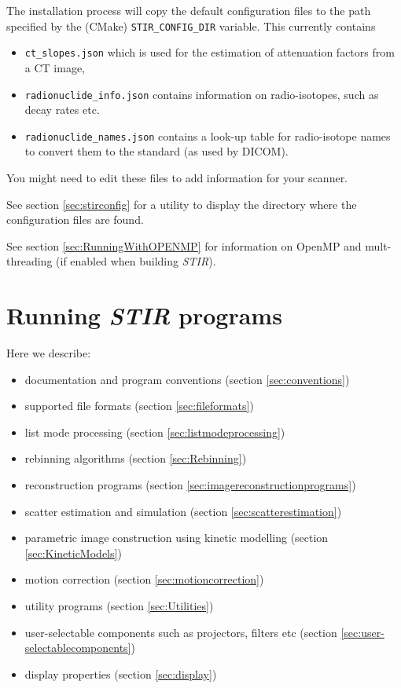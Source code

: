 \documentclass{article}
\begin{document}
The installation process will copy the default configuration files to the path specified by the
(CMake) \texttt{STIR\_CONFIG\_DIR} variable.
This currently contains
\begin{itemize}
\item \texttt{ct\_slopes.json} which is used for the estimation of attenuation factors from a CT image,
\item \texttt{radionuclide\_info.json} contains information on radio-isotopes, such as decay rates etc.
\item \texttt{radionuclide\_names.json} contains a look-up table for radio-isotope names to convert them
to the standard (as used by DICOM).
\end{itemize}
You might need to edit these files to add information for your scanner.

See section \ref{sec:stirconfig} for a utility to display the directory where the configuration files are found.

See section \ref{sec:RunningWithOPENMP} for information on OpenMP and mult-threading (if enabled when building \textit{STIR}).

\section{
Running \textit{STIR} programs}

Here we describe:
\begin{itemize}
\item documentation and program conventions (section \ref{sec:conventions})
\item supported file formats (section \ref{sec:fileformats})
\item list mode processing (section \ref{sec:listmodeprocessing})
\item rebinning algorithms (section \ref{sec:Rebinning})
\item reconstruction programs (section \ref{sec:imagereconstructionprograms})
\item scatter estimation and simulation (section \ref{sec:scatterestimation})
\item parametric image construction using kinetic modelling (section \ref{sec:KineticModels})
\item motion correction (section \ref{sec:motioncorrection})
\item utility programs (section \ref{sec:Utilities})
\item user-selectable components such as projectors, filters etc (section \ref{sec:user-selectablecomponents})
\item display properties (section \ref{sec:display})
\end{itemize}
\end{document}
